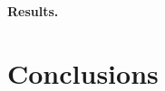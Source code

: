 \documentclass[letterpaper]{article}
\newcommand{\mypar}[1]{{\bf #1.}}
\begin{document}
\mypar{Results}
%

%

\section{Conclusions}
\end{document}
